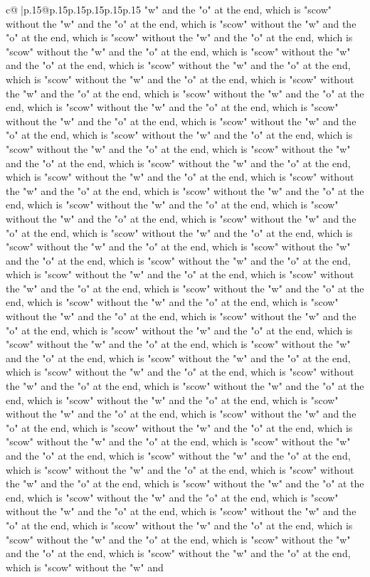 \documentclass{article}
\begin{document}
{\begin{supertabular}{c@{$\;$}|p{.15\linewidth}@{}p{.15\linewidth}p{.15\linewidth}p{.15\linewidth}p{.15\linewidth}p{.15\linewidth}}
{{{"w" and the "o" at the end, which is "scow" without the "w" and the "o" at the end, which is "scow" without the "w" and the "o" at the end, which is "scow" without the "w" and the "o" at the end, which is "scow" without the "w" and the "o" at the end, which is "scow" without the "w" and the "o" at the end, which is "scow" without the "w" and the "o" at the end, which is "scow" without the "w" and the "o" at the end, which is "scow" without the "w" and the "o" at the end, which is "scow" without the "w" and the "o" at the end, which is "scow" without the "w" and the "o" at the end, which is "scow" without the "w" and the "o" at the end, which is "scow" without the "w" and the "o" at the end, which is "scow" without the "w" and the "o" at the end, which is "scow" without the "w" and the "o" at the end, which is "scow" without the "w" and the "o" at the end, which is "scow" without the "w" and the "o" at the end, which is "scow" without the "w" and the "o" at the end, which is "scow" without the "w" and the "o" at the end, which is "scow" without the "w" and the "o" at the end, which is "scow" without the "w" and the "o" at the end, which is "scow" without the "w" and the "o" at the end, which is "scow" without the "w" and the "o" at the end, which is "scow" without the "w" and the "o" at the end, which is "scow" without the "w" and the "o" at the end, which is "scow" without the "w" and the "o" at the end, which is "scow" without the "w" and the "o" at the end, which is "scow" without the "w" and the "o" at the end, which is "scow" without the "w" and the "o" at the end, which is "scow" without the "w" and the "o" at the end, which is "scow" without the "w" and the "o" at the end, which is "scow" without the "w" and the "o" at the end, which is "scow" without the "w" and the "o" at the end, which is "scow" without the "w" and the "o" at the end, which is "scow" without the "w" and the "o" at the end, which is "scow" without the "w" and the "o" at the end, which is "scow" without the "w" and the "o" at the end, which is "scow" without the "w" and the "o" at the end, which is "scow" without the "w" and the "o" at the end, which is "scow" without the "w" and the "o" at the end, which is "scow" without the "w" and the "o" at the end, which is "scow" without the "w" and the "o" at the end, which is "scow" without the "w" and the "o" at the end, which is "scow" without the "w" and the "o" at the end, which is "scow" without the "w" and the "o" at the end, which is "scow" without the "w" and the "o" at the end, which is "scow" without the "w" and the "o" at the end, which is "scow" without the "w" and the "o" at the end, which is "scow" without the "w" and the "o" at the end, which is "scow" without the "w" and the "o" at the end, which is "scow" without the "w" and the "o" at the end, which is "scow" without the "w" and the "o" at the end, which is "scow" without the "w" and the "o" at the end, which is "scow" without the "w" and the "o" at the end, which is "scow" without the "w" and the "o" at the end, which is "scow" without the "w" and the "o" at the end, which is "scow" without the "w" and the "o" at the end, which is "scow" without the "w" and }}}
\end{supertabular}}
\end{document}
